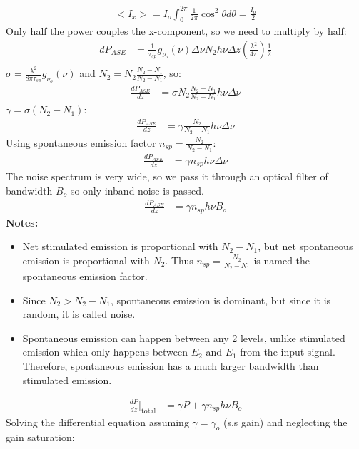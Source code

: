 \documentclass[11pt]{article}
\begin{document}
\begin{align*}
    <I_x> = I_o \int_{0}^{2 \pi} \frac{1}{2 \pi} \cos^2 \theta d\theta = \frac{I_o}{2}
\end{align*}
Only half the power couples the x-component, so we need to multiply by half:
\begin{align*}
    dP_{ASE} &= \frac{1}{\tau_{sp}} g_{\nu_o}(\nu) \Delta \nu N_2 h \nu \Delta z \left( \frac{\lambda^2}{4\pi} \right) \frac{1}{2} \\
\end{align*}
$\sigma = \frac{\lambda^2}{8 \pi \tau_{sp}} g_{\nu_o}(\nu)$ and  $N_2 = N_2 \frac{N_2-N_1}{N_2-N_1}$, so:
\begin{align*}
    \frac{dP_{ASE}}{dz}  &= \sigma N_2 \frac{N_2-N_1}{N_2-N_1} h \nu \Delta \nu
\end{align*}
$\gamma = \sigma (N_2 - N_1)$:
\begin{align*}
    \frac{dP_{ASE}}{dz} &= \gamma \frac{N_2}{N_2-N_1} h \nu \Delta \nu
\end{align*}
Using spontaneous emission factor $n_{sp} = \frac{N_2}{N_2-N_1}$:
\begin{align*}
    \frac{dP_{ASE}}{dz} &= \gamma n_{sp} h \nu \Delta \nu
\end{align*}
The noise spectrum is very wide, so we pass it through an optical filter of bandwidth $B_o$ so only inband noise is passed.
\begin{align*}
    \frac{dP_{ASE}}{dz} &= \gamma n_{sp} h \nu B_o
\end{align*}
\textbf{Notes:}
\begin{itemize}
    \item Net stimulated emission is proportional with $N_2-N_1$, but net spontaneous emission is proportional with $N_2$. Thus $n_{sp} = \frac{N_2}{N_2-N_1}$ is named the spontaneous emission factor.
    \item Since $N_2 > N_2 - N_1$, spontaneous emission is dominant, but since it is random, it is called noise.
    \item Spontaneous emission can happen between any 2 levels, unlike stimulated emission which only happens between $E_2$ and $E_1$ from the input signal. Therefore, spontaneous emission has a much larger bandwidth than stimulated emission.
\end{itemize}
\begin{align*}
    \frac{dP}{dz} \bigg|_{\text{total}} &= \gamma P + \gamma n_{sp} h \nu B_o
\end{align*}
Solving the differential equation assuming $\gamma = \gamma_o$ (s.s gain) and neglecting the gain saturation:
\end{document}

